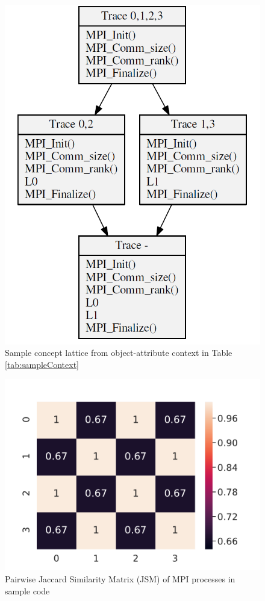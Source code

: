 




\begin{figure}[]
\centering
  \includegraphics[width=.55\textwidth]{diffTrace/figs/sampleCL.png}
  \caption{Sample concept lattice from object-attribute context in Table \ref{tab:sampleContext}}
  \label{fig:sampleCL}
\end{figure}

\begin{figure}[]
\centering
\includegraphics[width=.4\textwidth]{diffTrace/figs/oddEvenJSM2.pdf}
\caption{Pairwise Jaccard Similarity Matrix (JSM) of MPI processes in sample code}
\label{fig:jsm2}
\end{figure}




